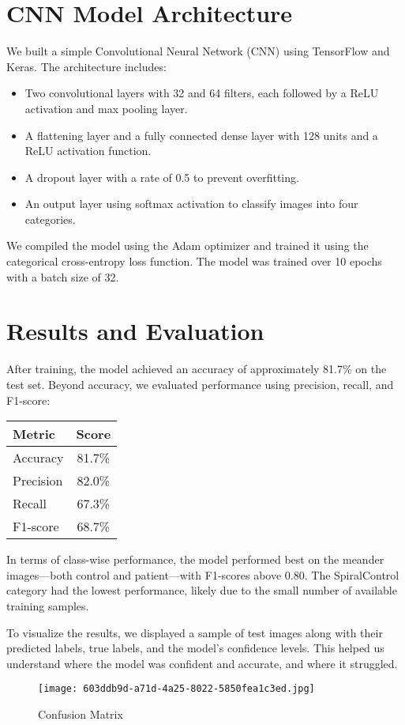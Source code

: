 \documentclass[twocolumn]{article}
\begin{document}
\section{CNN Model Architecture}
We built a simple Convolutional Neural Network (CNN) using TensorFlow and Keras. The architecture includes:
\begin{itemize}
    \item Two convolutional layers with 32 and 64 filters, each followed by a ReLU activation and max pooling layer.
    \item A flattening layer and a fully connected dense layer with 128 units and a ReLU activation function.
    \item A dropout layer with a rate of 0.5 to prevent overfitting.
    \item An output layer using softmax activation to classify images into four categories.
\end{itemize}
We compiled the model using the Adam optimizer and trained it using the categorical cross-entropy loss function. The model was trained over 10 epochs with a batch size of 32.

\section{Results and Evaluation}
After training, the model achieved an accuracy of approximately 81.7\% on the test set. Beyond accuracy, we evaluated performance using precision, recall, and F1-score:

\begin{center}
\begin{tabular}{lc}
    \toprule
    Metric & Score \\
    \midrule
    Accuracy & 81.7\% \\
    Precision & 82.0\% \\
    Recall & 67.3\% \\
    F1-score & 68.7\% \\
    \bottomrule
\end{tabular}
\end{center}

In terms of class-wise performance, the model performed best on the meander images—both control and patient—with F1-scores above 0.80. The SpiralControl category had the lowest performance, likely due to the small number of available training samples.

To visualize the results, we displayed a sample of test images along with their predicted labels, true labels, and the model’s confidence levels. This helped us understand where the model was confident and accurate, and where it struggled.
\begin{figure}[H]
    \centering
    \texttt{[image: 603ddb9d-a71d-4a25-8022-5850fea1c3ed.jpg]}
    \caption{Confusion Matrix}
    \label{fig:enter-label}
\end{figure}
\end{document}
